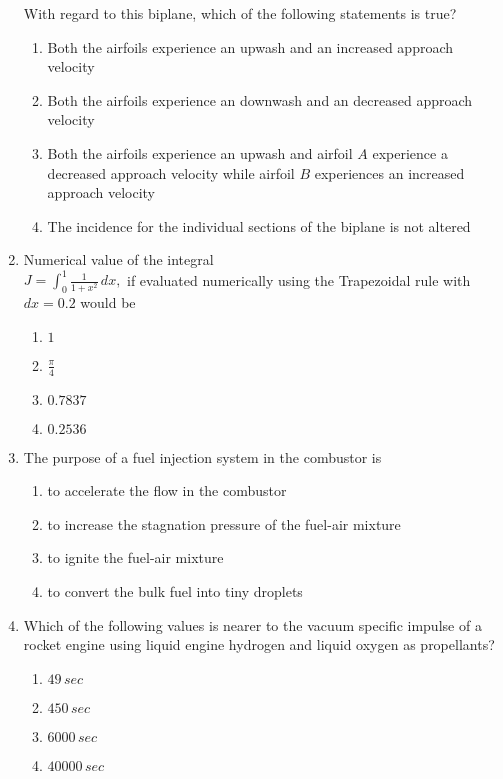 \documentclass[journal]{IEEEtran}
\begin{document}
\begin{enumerate}
With regard to this biplane, which of the following statements is true?
    \begin{enumerate}
        \item Both the airfoils experience an upwash and an increased approach velocity
        \item Both the airfoils experience an downwash and an decreased approach velocity
        \item Both the airfoils experience an upwash and airfoil $A$ experience a decreased approach velocity while airfoil $B$ experiences  an increased approach velocity
        \item The incidence for the individual sections of the biplane is not altered
    \end{enumerate}
    \item  Numerical value of the integral\\
    $J=\int_{0}^{1}\frac{1}{1+x^2}\, dx,$ if evaluated numerically using the Trapezoidal rule with $dx=0.2$ would be 
    \begin{enumerate}
        \item $1$
        \item $\frac{\pi}{4}$
        \item $0.7837$
        \item $0.2536$
    \end{enumerate}
    \item The purpose of  a fuel injection system in the combustor is
    \begin{enumerate}
        \item to accelerate the flow in the combustor
        \item to increase the stagnation pressure of the fuel-air mixture 
        \item to ignite the fuel-air mixture
        \item to convert the bulk fuel into tiny droplets
    \end{enumerate}
    \item Which of the following values is nearer to the vacuum specific impulse of a rocket engine using liquid engine hydrogen and liquid oxygen as propellants?
    \begin{enumerate}
        \item $49\,sec$
        \item $450\,sec$
        \item $6000\,sec$
        \item $40000\,sec$
    \end{enumerate}

\end{enumerate}
\end{document}
